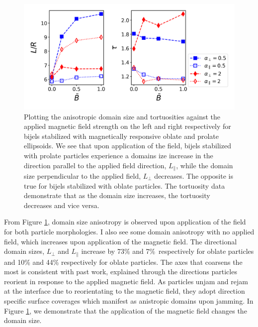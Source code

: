\begin{figure} 
\centering 
\includegraphics[scale=0.5]{../figures/results/paper2/domain_size_aniso-field_on.png} 
\caption{Plotting the anisotropic domain size and tortuosities against the applied magnetic field strength on the left and right respectively for bijels 
         stabilized with magnetically responsive oblate and prolate ellipsoids. We see that upon application of the field, bijels stabilized with prolate 
         particles experience a domains ize increase in the direction parallel to the applied field direction, $L_{\parallel}$, while the domain size 
         perpendicular to the applied field, $L_{\perp}$ decreases. The opposite is true for bijels stabilized with oblate particles. The tortuosity data 
         demonstrate that as the domain size increases, the tortuosity decreases and vice versa.} 
\label{fig:domain_size_aniso-field_on} 
\end{figure}

From Figure \ref{fig:domain_size_aniso-field_on}, domain size anisotropy is observed upon application of the field for both
particle morphologies. I also see some domain anisotropy with no applied field, which increases upon application of the magnetic field.
The directional domain sizes, $L_{\perp}$ and $L_{\parallel}$ increase by 73\% and 7\%\ respectively for oblate particles and
10\% and 44\% respectively for oblate particles. The axes that coarsens the most is consistent with past work, explained through the
directions particles reorient in response to the applied magnetic field. As particles unjam and rejam at the interface due to reorientating 
to the magnetic field, they adopt direction specific surface coverages which manifest as anistropic domains upon jamming. In Figure 
\ref{fig:domain_size_aniso-field_on}, we demonstrate that the application of the magnetic field changes the domain size. 

